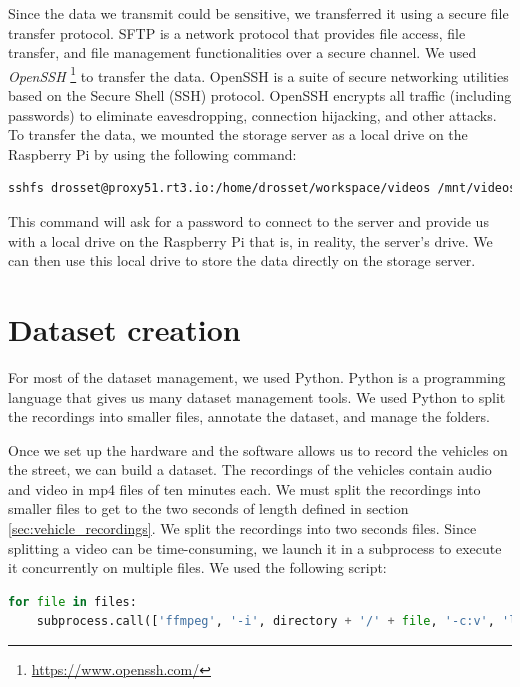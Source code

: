 Since the data we transmit could be sensitive, we transferred it using a secure file transfer protocol. SFTP is a network protocol that provides file access, file transfer, and file management functionalities over a secure channel. We used \textit{OpenSSH} \footnote{\url{https://www.openssh.com/}} to transfer the data. OpenSSH is a suite of secure networking utilities based on the Secure Shell (SSH) protocol. OpenSSH encrypts all traffic (including passwords) to eliminate eavesdropping, connection hijacking, and other attacks. To transfer the data, we mounted the storage server as a local drive on the Raspberry Pi by using the following command:

\begin{lstlisting}[language=bash]
    sshfs drosset@proxy51.rt3.io:/home/drosset/workspace/videos /mnt/videos -p 33838
\end{lstlisting}

This command will ask for a password to connect to the server and provide us with a local drive on the Raspberry Pi that is, in reality, the server's drive. We can then use this local drive to store the data directly on the storage server.

\section{Dataset creation}

For most of the dataset management, we used Python. Python is a programming language that gives us many dataset management tools. We used Python to split the recordings into smaller files, annotate the dataset, and manage the folders.

Once we set up the hardware and the software allows us to record the vehicles on the street, we can build a dataset. The recordings of the vehicles contain audio and video in mp4 files of ten minutes each. We must split the recordings into smaller files to get to the two seconds of length defined in section \ref{sec:vehicle_recordings}. We split the recordings into two seconds files. Since splitting a video can be time-consuming, we launch it in a subprocess to execute it concurrently on multiple files. We used the following script:

\begin{lstlisting}[language=python]
for file in files:
    subprocess.call(['ffmpeg', '-i', directory + '/' + file, '-c:v', 'libx264', '-crf', '22', '-map', '0', '-segment_time', time, '-reset_timestamps', '1', '-g', '30', '-sc_threshold', '0', '-force_key_frames', 'expr:gte(t,n_forced*'+str(time)+')', '-f', 'segment', directory[:-1]+'-2sec/' + file + '%05d.mp4'])
\end{lstlisting}

